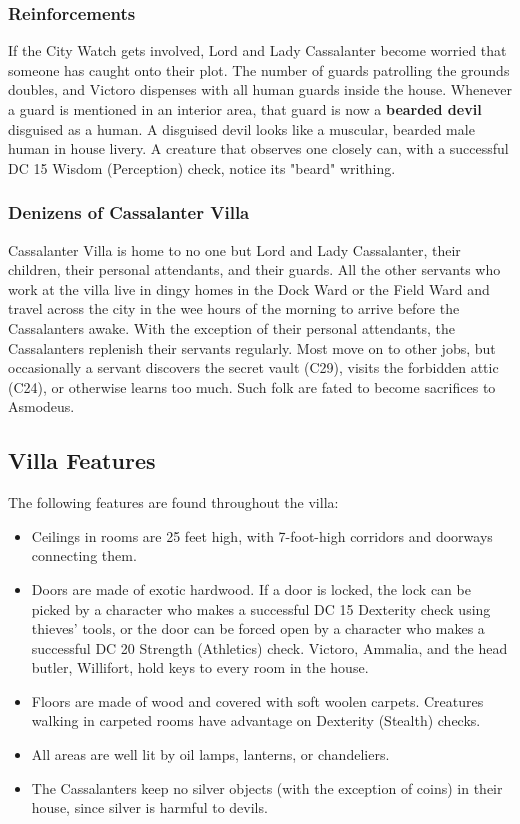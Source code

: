 \documentclass[10pt,a4paper,twoside,twocolumn,openany,nodeprecatedcode]{dndbook}
\begin{document}
\subsubsection{Reinforcements}
If the City Watch gets involved, Lord and Lady Cassalanter become worried that someone has caught onto their plot. The number of guards patrolling the grounds doubles, and Victoro dispenses with all human guards inside the house. Whenever a guard is mentioned in an interior area, that guard is now a \textbf{bearded devil} disguised as a human. A disguised devil looks like a muscular, bearded male human in house livery. A creature that observes one closely can, with a successful DC 15 Wisdom (Perception) check, notice its "beard" writhing.
\subsubsection{Denizens of Cassalanter Villa}
Cassalanter Villa is home to no one but Lord and Lady Cassalanter, their children, their personal attendants, and their guards. All the other servants who work at the villa live in dingy homes in the Dock Ward or the Field Ward and travel across the city in the wee hours of the morning to arrive before the Cassalanters awake.
With the exception of their personal attendants, the Cassalanters replenish their servants regularly. Most move on to other jobs, but occasionally a servant discovers the secret vault (C29), visits the forbidden attic (C24), or otherwise learns too much. Such folk are fated to become sacrifices to Asmodeus.
\subsection{Villa Features}
The following features are found throughout the villa:
\begin{itemize}

\item Ceilings in rooms are 25 feet high, with 7-foot-high corridors and doorways connecting them.
\item Doors are made of exotic hardwood. If a door is locked, the lock can be picked by a character who makes a successful DC 15 Dexterity check using thieves' tools, or the door can be forced open by a character who makes a successful DC 20 Strength (Athletics) check. Victoro, Ammalia, and the head butler, Willifort, hold keys to every room in the house.
\item Floors are made of wood and covered with soft woolen carpets. Creatures walking in carpeted rooms have advantage on Dexterity (Stealth) checks.
\item All areas are well lit by oil lamps, lanterns, or chandeliers.
\item The Cassalanters keep no silver objects (with the exception of coins) in their house, since silver is harmful to devils.
\end{itemize}
\end{document}
